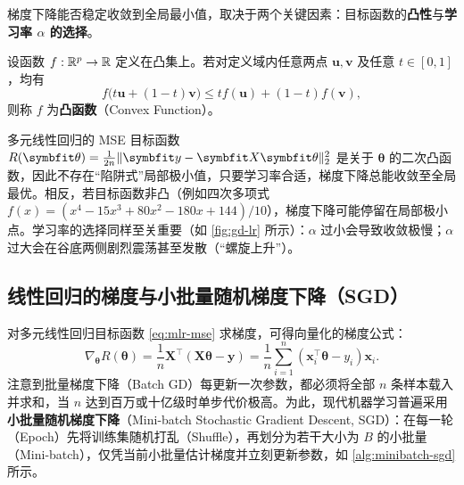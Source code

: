 梯度下降能否稳定收敛到全局最小值，取决于两个关键因素：目标函数的\textbf{凸性}与\textbf{学习率 $\alpha$ 的选择}。

\begin{definition}[凸函数]\label{def:convex-function}
设函数 $f:\mathbb{R}^p \to \mathbb{R}$ 定义在凸集上。若对定义域内任意两点 $\bm{u}, \bm{v}$ 及任意 $t \in [0, 1]$，均有
\begin{equation}\label{eq:convexity}
  f\bigl(t\bm{u} + (1-t)\bm{v}\bigr) \le t f(\bm{u}) + (1-t)f(\bm{v}),
\end{equation}
则称 $f$ 为\textbf{凸函数}（Convex Function）。
\end{definition}

多元线性回归的 MSE 目标函数 $R(\bm{\theta}) = \frac{1}{2n}\norm{\bm{y}-\bm{X}\bm{\theta}}_2^2$ 是关于 $\bm{\theta}$ 的二次凸函数，因此不存在“陷阱式”局部极小值，只要学习率合适，梯度下降总能收敛至全局最优。相反，若目标函数非凸（例如四次多项式 $f(x)=(x^4-15x^3+80x^2-180x+144)/10$），梯度下降可能停留在局部极小点。学习率的选择同样至关重要（如 \cref{fig:gd-lr} 所示）：$\alpha$ 过小会导致收敛极慢；$\alpha$ 过大会在谷底两侧剧烈震荡甚至发散（“螺旋上升”）。


\subsection{线性回归的梯度与小批量随机梯度下降（SGD）}

对多元线性回归目标函数 \cref{eq:mlr-mse} 求梯度，可得向量化的梯度公式：
\begin{equation}\label{eq:mlr-gradient}
  \nabla_{\bm{\theta}}R(\bm{\theta})
  = \frac{1}{n}\bm{X}^\top(\bm{X}\bm{\theta} - \bm{y})
  = \frac{1}{n}\sum_{i=1}^{n}(\bm{x}_i^\top\bm{\theta} - y_i)\bm{x}_i.
\end{equation}
注意到批量梯度下降（Batch GD）每更新一次参数，都必须将全部 $n$ 条样本载入并求和，当 $n$ 达到百万或十亿级时单步代价极高。为此，现代机器学习普遍采用\textbf{小批量随机梯度下降}（Mini-batch Stochastic Gradient Descent, SGD）：在每一轮（Epoch）先将训练集随机打乱（Shuffle），再划分为若干大小为 $B$ 的小批量（Mini-batch），仅凭当前小批量估计梯度并立刻更新参数，如 \cref{alg:minibatch-sgd} 所示。

